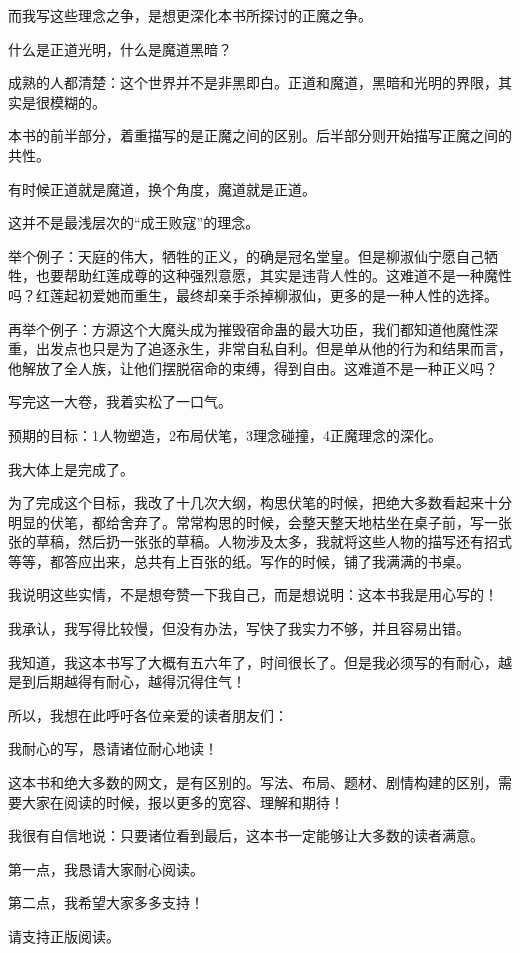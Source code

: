 \begin{this_body}
而我写这些理念之争，是想更深化本书所探讨的正魔之争。

什么是正道光明，什么是魔道黑暗？

成熟的人都清楚：这个世界并不是非黑即白。正道和魔道，黑暗和光明的界限，其实是很模糊的。

本书的前半部分，着重描写的是正魔之间的区别。后半部分则开始描写正魔之间的共性。

有时候正道就是魔道，换个角度，魔道就是正道。

这并不是最浅层次的“成王败寇”的理念。

举个例子：天庭的伟大，牺牲的正义，的确是冠名堂皇。但是柳淑仙宁愿自己牺牲，也要帮助红莲成尊的这种强烈意愿，其实是违背人性的。这难道不是一种魔性吗？红莲起初爱她而重生，最终却亲手杀掉柳淑仙，更多的是一种人性的选择。

再举个例子：方源这个大魔头成为摧毁宿命蛊的最大功臣，我们都知道他魔性深重，出发点也只是为了追逐永生，非常自私自利。但是单从他的行为和结果而言，他解放了全人族，让他们摆脱宿命的束缚，得到自由。这难道不是一种正义吗？

写完这一大卷，我着实松了一口气。

预期的目标：1人物塑造，2布局伏笔，3理念碰撞，4正魔理念的深化。

我大体上是完成了。

为了完成这个目标，我改了十几次大纲，构思伏笔的时候，把绝大多数看起来十分明显的伏笔，都给舍弃了。常常构思的时候，会整天整天地枯坐在桌子前，写一张张的草稿，然后扔一张张的草稿。人物涉及太多，我就将这些人物的描写还有招式等等，都答应出来，总共有上百张的纸。写作的时候，铺了我满满的书桌。

我说明这些实情，不是想夸赞一下我自己，而是想说明：这本书我是用心写的！

我承认，我写得比较慢，但没有办法，写快了我实力不够，并且容易出错。

我知道，我这本书写了大概有五六年了，时间很长了。但是我必须写的有耐心，越是到后期越得有耐心，越得沉得住气！

所以，我想在此呼吁各位亲爱的读者朋友们：

我耐心的写，恳请诸位耐心地读！

这本书和绝大多数的网文，是有区别的。写法、布局、题材、剧情构建的区别，需要大家在阅读的时候，报以更多的宽容、理解和期待！

我很有自信地说：只要诸位看到最后，这本书一定能够让大多数的读者满意。

第一点，我恳请大家耐心阅读。

第二点，我希望大家多多支持！

请支持正版阅读。


\end{this_body}
